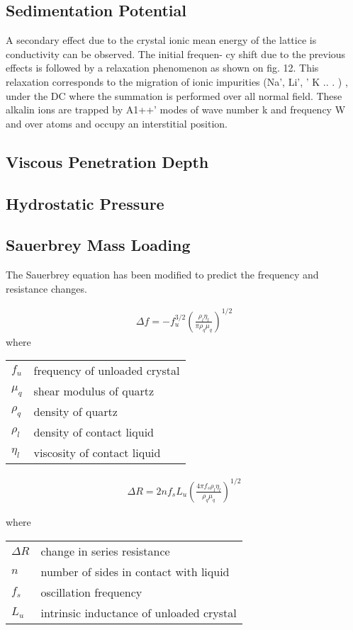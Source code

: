 \documentclass[a4paper]{article}
\begin{document}
\subsection{Sedimentation Potential}
A secondary effect due to the crystal ionic
mean energy of the lattice is
conductivity can be observed. The initial frequen-
cy shift due to the previous effects
is followed
by a relaxation phenomenon as shown on fig. 12.
This relaxation corresponds to the migration
of
ionic impurities (Na', Li',
' K
.. .
) , under the DC
where the summation is performed over all normal
field. These alkalin ions are trapped by A1++'
modes of wave number k and frequency
W and
over
atoms and occupy an interstitial position.



\subsection{Viscous Penetration Depth}
\subsection{Hydrostatic Pressure}

\subsection{Sauerbrey Mass Loading}
The Sauerbrey equation has been modified to predict the frequency and
resistance changes.

\begin{align}
  \Delta f = -f_u^{3/2} \left(\frac{\rho_l \eta_l}{\pi \rho_q \mu_q}\right)^{1/2}
\end{align}
where

\begin{tabular}{ll}
  $f_u$    & frequency of unloaded crystal \\
  $\mu_q$  & shear modulus of quartz       \\
  $\rho_q$ & density of quartz             \\
  $\rho_l$ & density of contact liquid     \\
  $\eta_l$ & viscosity of contact liquid
\end{tabular}

\begin{align}
  \Delta R = 2 n f_s L_u \left(\frac{4 \pi f_s \rho_l \eta_l}{\rho_q \mu_q}\right)^{1/2}
\end{align}

where
\begin{tabular}{ll}
  $\Delta R$ & change in series resistance              \\
  $n$        & number of sides in contact with liquid   \\
  $f_s$      & oscillation frequency                    \\
  $L_u$      & intrinsic inductance of unloaded crystal \\
\end{tabular}
\end{document}
